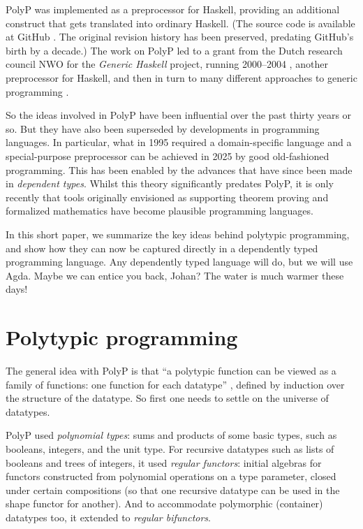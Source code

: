 \documentclass[fleqn,runningheads]{llncs}
\begin{document}
PolyP was implemented \cite{Jansson&Jeuring97:Polytypic} as a preprocessor for Haskell, providing an additional  construct that gets translated into ordinary Haskell.
(The source code is available at GitHub \cite{PolyP-github}. The original revision history has been preserved, predating GitHub's birth by a decade.)
The work on PolyP led to a grant from the Dutch research council NWO for the \textit{Generic Haskell} project, running 2000--2004 \cite{GH-project}, another preprocessor for Haskell, and then in turn to many different approaches to generic programming \cite{Garcia*2007:Extended}.

So the ideas involved in PolyP have been influential over the past thirty years or so. But they have also been superseded by developments in programming languages. In particular, what in 1995 required a domain-specific language and a special-purpose preprocessor can be achieved in 2025 by good old-fashioned programming. This has been enabled by the advances that have since been made in \emph{dependent types}. Whilst this theory significantly predates PolyP, it is only recently that tools originally envisioned as supporting theorem proving and formalized mathematics have become plausible programming languages.

In this short paper, we summarize the key ideas behind polytypic programming, and show how they can now be captured directly in a dependently typed programming language. Any dependently typed language will do, but we will use Agda. Maybe we can entice you back, Johan? The water is much warmer these days!

\section{Polytypic programming}

The general idea with PolyP is that ``a polytypic function can be viewed as a family of functions: one function for each datatype'' \cite{Jeuring&Jansson96:Polytypic}, defined by induction over the structure of the datatype. So first one needs to settle on the universe of datatypes.

PolyP used \emph{polynomial types}: sums and products of some basic types, such as booleans, integers, and the unit type. For recursive datatypes such as lists of booleans and trees of integers, it used \emph{regular functors}: initial algebras for functors constructed from polynomial operations on a type parameter, closed under certain compositions (so that one recursive datatype can be used in the shape functor for another). And to accommodate polymorphic (container) datatypes too, it extended to \emph{regular bifunctors}.
\end{document}
